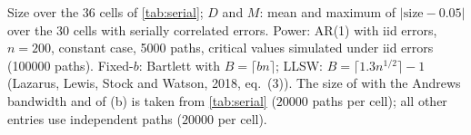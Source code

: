 Size over the 36 cells of \cref{tab:serial}; $D$ and $M$: mean and maximum of $|\text{size} - 0.05|$ over the 30 cells with serially correlated errors. Power: AR(1) with iid errors, $n = 200$, constant case, 5000 paths, critical values simulated under iid errors (100000 paths). Fixed-$b$: Bartlett with $B = \lceil b n\rceil$; LLSW: $B = \lceil 1.3 n^{1/2}\rceil - 1$ (Lazarus, Lewis, Stock and Watson, 2018, eq.~(3)). The size of \RMGLS{} with the Andrews bandwidth and of (b) is taken from \cref{tab:serial} ($20000$ paths per cell); all other entries use independent paths ($20000$ per cell).
